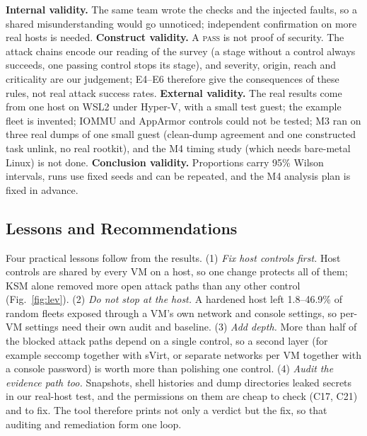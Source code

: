 \documentclass[conference]{IEEEtran}
\newcommand{\pass}{\textsc{pass}}
\begin{document}
\textbf{Internal validity.} The same team wrote the checks and the injected faults, so a shared misunderstanding would go unnoticed; independent confirmation on more real hosts is needed. \textbf{Construct validity.} A \pass{} is not proof of security. The attack chains encode our reading of the survey (a stage without a control always succeeds, one passing control stops its stage), and severity, origin, reach and criticality are our judgement; E4--E6 therefore give the consequences of these rules, not real attack success rates. \textbf{External validity.} The real results come from one host on WSL2 under Hyper-V, with a small test guest; the example fleet is invented; IOMMU and AppArmor controls could not be tested; M3 ran on three real dumps of one small guest (clean-dump agreement and one constructed task unlink, no real rootkit), and the M4 timing study (which needs bare-metal Linux) is not done. \textbf{Conclusion validity.} Proportions carry 95\% Wilson intervals, runs use fixed seeds and can be repeated, and the M4 analysis plan is fixed in advance.

\subsection{Lessons and Recommendations}
Four practical lessons follow from the results. (1) \emph{Fix host controls first.} Host controls are shared by every VM on a host, so one change protects all of them; KSM alone removed more open attack paths than any other control (Fig.~\ref{fig:lev}). (2) \emph{Do not stop at the host.} A hardened host left 1.8--46.9\% of random fleets exposed through a VM's own network and console settings, so per-VM settings need their own audit and baseline. (3) \emph{Add depth.} More than half of the blocked attack paths depend on a single control, so a second layer (for example seccomp together with sVirt, or separate networks per VM together with a console password) is worth more than polishing one control. (4) \emph{Audit the evidence path too.} Snapshots, shell histories and dump directories leaked secrets in our real-host test, and the permissions on them are cheap to check (C17, C21) and to fix. The tool therefore prints not only a verdict but the fix, so that auditing and remediation form one loop.
\end{document}
